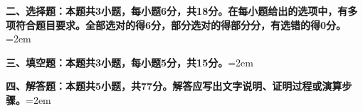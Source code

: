 \documentclass[UTF8,a4paper]{ctexart}
\begin{document}
\begin{enumerate}[series=s0, leftmargin=2em, itemsep=0.8em]

\end{enumerate}
\vspace{1em}



\noindent\textbf{二、选择题：本题共3小题，每小题6分，共18分。在每小题给出的选项中，有多项符合题目要求。全部选对的得6分，部分选对的得部分分，有选错的得0分。}\hangindent=2em
\par\medskip




\begin{enumerate}[series=s1, leftmargin=2em, itemsep=0.8em]

\end{enumerate}
\vspace{1em}



\noindent\textbf{三、填空题：本题共3小题，每小题5分，共15分。}\hangindent=2em
\par\medskip




\begin{enumerate}[series=s2, leftmargin=2em, itemsep=0.8em]

\end{enumerate}
\vspace{1em}



\noindent\textbf{四、解答题：本题共5小题，共77分。解答应写出文字说明、证明过程或演算步骤。}\hangindent=2em
\par\medskip




\begin{enumerate}[series=s3, leftmargin=2em, itemsep=0.8em]

\end{enumerate}
\vspace{1em}
\end{document}
